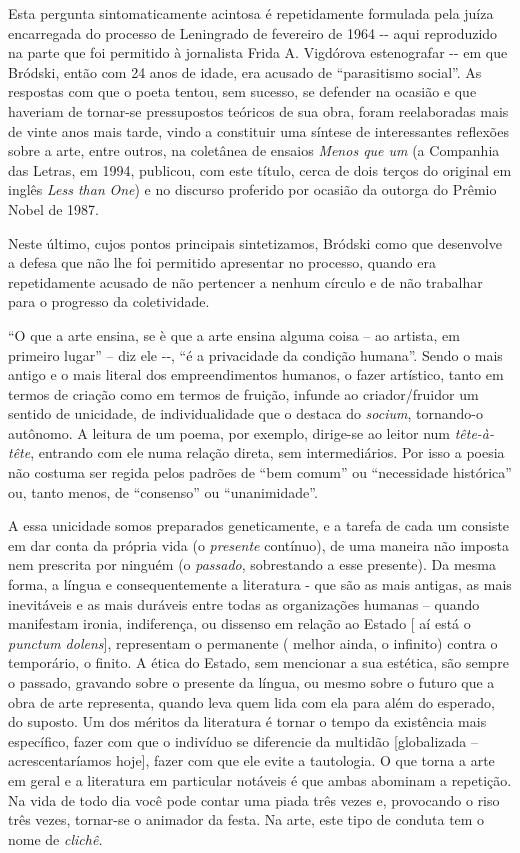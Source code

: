 Esta pergunta sintomaticamente acintosa é repetidamente formulada pela
juíza encarregada do processo de Leningrado de fevereiro de 1964 -\/-
aqui reproduzido na parte que foi permitido à jornalista Frida A.
Vigdórova estenografar -\/- em que Bródski, então com 24 anos de idade,
era acusado de ``parasitismo social''. As respostas com que o poeta
tentou, sem sucesso, se defender na ocasião e que haveriam de tornar-se
pressupostos teóricos de sua obra, foram reelaboradas mais de vinte anos
mais tarde, vindo a constituir uma síntese de interessantes reflexões
sobre a arte, entre outros, na coletânea de ensaios \emph{Menos que um}
(a Companhia das Letras, em 1994, publicou, com este título, cerca de
dois terços do original em inglês \emph{Less than} \emph{One}) e no
discurso proferido por ocasião da outorga do Prêmio Nobel de 1987.

Neste último, cujos pontos principais sintetizamos, Bródski como que
desenvolve a defesa que não lhe foi permitido apresentar no processo,
quando era repetidamente acusado de não pertencer a nenhum círculo e de
não trabalhar para o progresso da coletividade.

``O que a arte ensina, se è que a arte ensina alguma coisa -- ao
artista, em primeiro lugar'' -- diz ele -\/-, ``é a privacidade da
condição humana''. Sendo o mais antigo e o mais literal dos
empreendimentos humanos, o fazer artístico, tanto em termos de criação
como em termos de fruição, infunde ao criador/fruidor um sentido de
unicidade, de individualidade que o destaca do \emph{socium}, tornando-o
autônomo. A leitura de um poema, por exemplo, dirige-se ao leitor num
\emph{tête-à-tête}, entrando com ele numa relação direta, sem
intermediários. Por isso a poesia não costuma ser regida pelos padrões
de ``bem comum'' ou ``necessidade histórica'' ou, tanto menos, de
``consenso'' ou ``unanimidade''.

A essa unicidade somos preparados geneticamente, e a tarefa de cada um
consiste em dar conta da própria vida (o \emph{presente} contínuo), de
uma maneira não imposta nem prescrita por ninguém (o \emph{passado},
sobrestando a esse presente). Da mesma forma, a língua e
consequentemente a literatura - que são as mais antigas, as mais
inevitáveis e as mais duráveis entre todas as organizações humanas --
quando manifestam ironia, indiferença, ou dissenso em relação ao Estado
{[} aí está o \emph{punctum dolens}{]}, representam o permanente (
melhor ainda, o infinito) contra o temporário, o finito. A ética do
Estado, sem mencionar a sua estética, são sempre o passado, gravando
sobre o presente da língua, ou mesmo sobre o futuro que a obra de arte
representa, quando leva quem lida com ela para além do esperado, do
suposto. Um dos méritos da literatura é tornar o tempo da existência
mais específico, fazer com que o indivíduo se diferencie da multidão
{[}globalizada -- acrescentaríamos hoje{]}, fazer com que ele evite a
tautologia. O que torna a arte em geral e a literatura em particular
notáveis é que ambas abominam a repetição. Na vida de todo dia você pode
contar uma piada três vezes e, provocando o riso três vezes, tornar-se o
animador da festa. Na arte, este tipo de conduta tem o nome de
\emph{clichê.}

